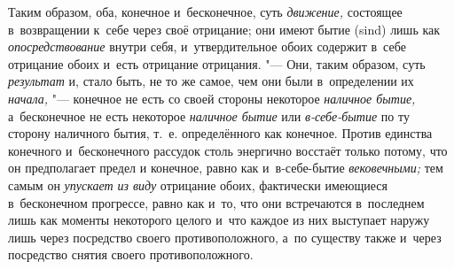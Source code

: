 Таким образом, оба, конечное и~бесконечное, суть
{\em движение,} состоящее в~возвращении к~себе через
своё отрицание; они имеют бытие (sind) лишь как
{\em опосредствование} внутри себя, и~утвердительное
обоих содержит в~себе отрицание обоих и~есть отрицание отрицания. "--- Они,
таким образом, суть {\em результат} и, стало быть, не
то же самое, чем они были в~определении их
{\em начала,} "--- конечное не есть со своей стороны
некоторое {\em наличное бытие,} а~бесконечное не есть
некоторое {\em наличное бытие} или
{\em в-себе-бытие} по ту сторону наличного бытия, т.~е.
определённого как конечное. Против единства конечного и~бесконечного
рассудок столь энергично восстаёт только потому, что он предполагает предел
и конечное, равно как и~в-себе-бытие {\em вековечными;}
тем самым он {\em упускает из виду} отрицание обоих,
фактически имеющиеся в~бесконечном прогрессе, равно как и~то, что они
встречаются в~последнем лишь как моменты некоторого целого и~что каждое из
них выступает наружу лишь через посредство своего противоположного, а~по
существу также и~через посредство снятия своего противоположного.

